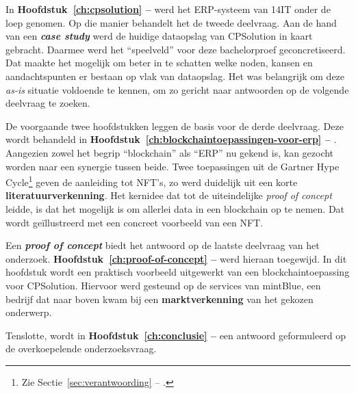 In \textbf{Hoofdstuk~\ref{ch:cpsolution} -- } werd het ERP-systeem van 14IT onder de loep genomen. Op die manier behandelt het de tweede deelvraag. Aan de hand van een \textbf{\textit{case study}} werd de huidige dataopslag van CPSolution in kaart gebracht. Daarmee werd het ``speelveld'' voor deze bachelorproef geconcretiseerd. Dat maakte het mogelijk om beter in te schatten welke noden, kansen en aandachtspunten er bestaan op vlak van dataopslag. Het was belangrijk om deze \textit{as-is} situatie voldoende te kennen, om zo gericht naar antwoorden op de volgende deelvraag te zoeken.

De voorgaande twee hoofdstukken leggen de basis voor de derde deelvraag. Deze wordt behandeld in \textbf{Hoofdstuk~\ref{ch:blockchaintoepassingen-voor-erp} -- }. Aangezien zowel het begrip ``blockchain'' als ``ERP'' nu gekend is, kan gezocht worden naar een synergie tussen beide. Twee toepassingen uit de Gartner Hype Cycle\footnote{Zie Sectie~\ref{sec:verantwoording} -- .} geven de aanleiding tot NFT's, zo werd duidelijk uit een korte \textbf{literatuurverkenning}. Het kernidee dat tot de uiteindelijke \textit{proof of concept} leidde, is dat het mogelijk is om allerlei data in een blockchain op te nemen. Dat wordt geïllustreerd met een concreet voorbeeld van een NFT.

Een \textbf{\textit{proof of concept}} biedt het antwoord op de laatste deelvraag van het onderzoek. \textbf{Hoofdstuk~\ref{ch:proof-of-concept} -- } werd hieraan toegewijd. In dit hoofdstuk wordt een praktisch voorbeeld uitgewerkt van een blockchaintoepassing voor CPSolution. Hiervoor werd gesteund op de services van mintBlue, een bedrijf dat naar boven kwam bij een \textbf{marktverkenning} van het gekozen onderwerp.

Tenslotte, wordt in \textbf{Hoofdstuk~\ref{ch:conclusie} -- } een antwoord geformuleerd op de overkoepelende onderzoeksvraag. 

